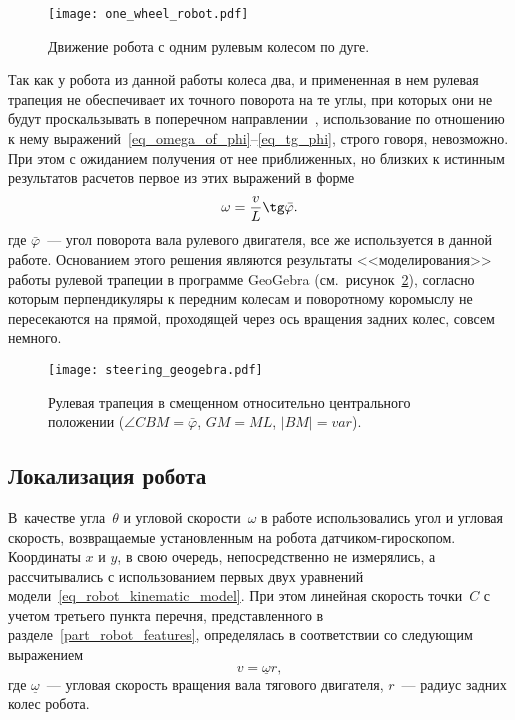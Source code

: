 \begin{figure}[h]
    \centering
    \texttt{[image: one\_wheel\_robot.pdf]}
    \caption{Движение робота с одним рулевым колесом по дуге.}
    \vspace{0cm}
    \label{img_one_wheel_robot}
\end{figure}

Так как у робота из данной работы колеса два, и примененная в нем рулевая трапеция не обеспечивает их точного поворота на те углы, при которых они не будут проскальзывать в поперечном направлении~\cite{ackerman_steering}, использование по отношению к нему выражений~\eqref{eq_omega_of_phi}--\eqref{eq_tg_phi}, строго говоря, невозможно.
При этом с ожиданием получения от нее приближенных, но близких к истинным результатов расчетов первое из этих выражений в форме
\begin{equation}
    \omega = \frac{v}{L} \tg \bar\varphi \ldotp
\end{equation}
где $\bar\varphi$~--- угол поворота вала рулевого двигателя, все же используется в данной работе.
Основанием этого решения являются результаты <<моделирования>> работы рулевой трапеции в программе GeoGebra (см.~рисунок~\ref{img_steering_geogebra}), согласно которым перпендикуляры к передним колесам и  поворотному коромыслу не пересекаются на прямой, проходящей через ось вращения задних колес, совсем немного.

\begin{figure}[h]
    \centering
    \texttt{[image: steering\_geogebra.pdf]}
    \caption{Рулевая трапеция в смещенном относительно центрального положении ($\angle CBM = \bar{\varphi}$, $GM=ML$, $|BM|=var$).}
    \vspace{0cm}
    \label{img_steering_geogebra}
\end{figure}



\subsection{Локализация робота}
В~качестве угла~$\theta$ и угловой скорости~$\omega$ в работе использовались угол и угловая скорость, возвращаемые установленным на робота датчиком-гироскопом.
Координаты $x$ и $y$, в свою очередь, непосредственно не измерялись, а рассчитывались с использованием первых двух уравнений модели~\eqref{eq_robot_kinematic_model}.
При этом линейная скорость точки~$C$ с учетом третьего пункта перечня, представленного в разделе~\ref{part_robot_features}, определялась в соответствии со следующим выражением
\begin{equation}
    v = \underline{\omega} r,
\end{equation}
где $\underline{\omega}$~--- угловая скорость вращения вала тягового двигателя, $r$~--- радиус задних колес робота.

